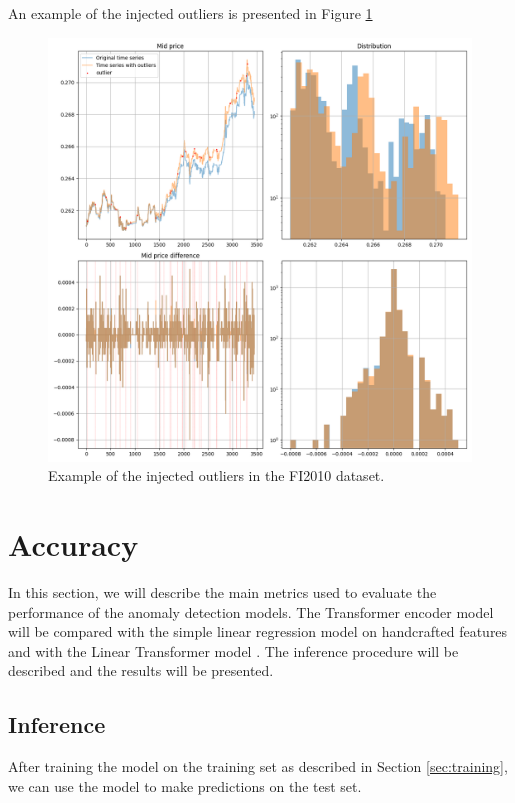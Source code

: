 \documentclass[a4paper, twoside]{report}
\theoremstyle{definition}
\numberwithin{equation}{section}
\begin{document}
An example of the injected outliers is presented in Figure \ref{fig:FI2010_example_outliers_injected}
\begin{figure}[h!]
    \centering
    \includegraphics[width=\textwidth]{FI2010_example_outliers_injected.png}
    \caption{Example of the injected outliers in the FI2010 dataset.}
    \label{fig:FI2010_example_outliers_injected}
\end{figure}

\section{Accuracy}

In this section, we will describe the main metrics used to evaluate the performance of the anomaly detection models.
The Transformer encoder model will be compared with the simple linear regression model on handcrafted features
and with the Linear Transformer model \cite{2006.16236}.
The inference procedure will be described and the results will be presented.

\subsection{Inference}
After training the model on the training set as described in Section \ref{sec:training}, we can use the model to make predictions on the test set.
\end{document}
